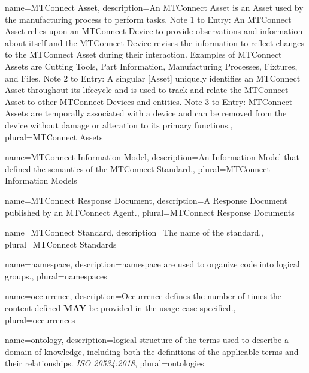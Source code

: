 {
    name={MTConnect Asset},
	description={An \gls{MTConnect Asset} is an \gls{Asset} used by the manufacturing process to perform tasks.
\newline Note 1 to Entry: An \gls{MTConnect Asset} relies upon an \gls{MTConnect Device} to provide \glspl{observation} and information about itself and the \gls{MTConnect Device} revises the information to reflect changes to the \gls{MTConnect Asset} during their interaction. Examples of \glspl{MTConnect Asset} are Cutting Tools, Part Information, Manufacturing Processes, Fixtures, and Files.
\newline Note 2 to Entry: A singular [Asset] uniquely identifies an \gls{MTConnect Asset} throughout its lifecycle and is used to track and relate the \gls{MTConnect Asset} to other \glspl{MTConnect Device} and entities.
\newline Note 3 to Entry: \glspl{MTConnect Asset} are temporally associated with a device and can be removed from the device without damage or alteration to its primary functions.},
	plural={MTConnect Assets}
}

{
    name={MTConnect Information Model},
	description={An \gls{Information Model} that defined the semantics of the MTConnect Standard.},
	plural={MTConnect Information Models}
}

{
    name={MTConnect Response Document},
	description={A \gls{Response Document} published by an \gls{MTConnect Agent}.},
	plural={MTConnect Response Documents}
}

{
    name={MTConnect Standard},
	description={The name of the standard.},
	plural={MTConnect Standards}
}

{
    name={namespace},
	description={\gls{namespace} are used to organize code into logical groups.},
	plural={namespaces}
}

{
    name={occurrence},
	description={Occurrence defines the number of times the content defined \textbf{MAY} be provided in the usage case specified.},
	plural={occurrences}
}

{
    name={ontology},
	description={logical structure of the terms used to describe a domain of knowledge, including both the definitions of the applicable terms and their relationships. \textit{ISO 20534:2018}},
	plural={ontologies}
}

